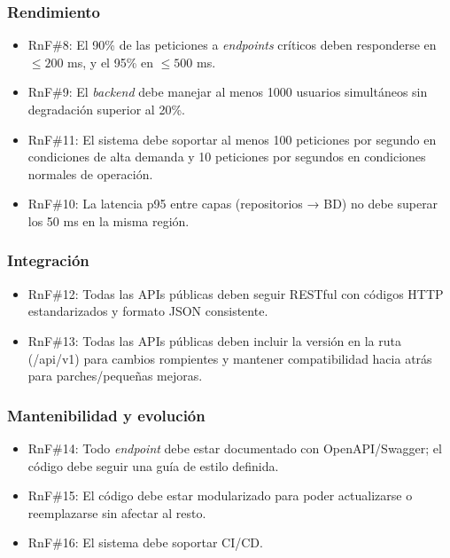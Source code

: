 \subsubsection{Rendimiento}

\begin{itemize}
	\item \ac{RnF}\#8: El 90\% de las peticiones a \textit{endpoints} críticos deben responderse en $ \leq 200 $ ms, y el 95\% en $ \leq 500 $ ms.
	\item \ac{RnF}\#9: El \textit{backend} debe manejar al menos 1000 usuarios simultáneos sin degradación superior al 20\%.
	\item \ac{RnF}\#11: El sistema debe soportar al menos 100 peticiones por segundo en condiciones de alta demanda y 10 peticiones por segundos en condiciones normales de operación.
	\item \ac{RnF}\#10: La latencia p95 entre capas (repositorios → \ac{BD}) no debe superar los 50 ms en la misma región.
\end{itemize}

\subsubsection{Integración}

\begin{itemize}
	\item \ac{RnF}\#12: Todas las \ac{API}s públicas deben seguir \ac{REST}ful con códigos \ac{HTTP} estandarizados y formato \ac{JSON} consistente.
	\item \ac{RnF}\#13: Todas las \ac{API}s públicas deben incluir la versión en la ruta (/api/v1) para cambios rompientes y mantener compatibilidad hacia atrás para parches/pequeñas mejoras.
\end{itemize}

\subsubsection{Mantenibilidad y evolución}

\begin{itemize}
	\item \ac{RnF}\#14: Todo \textit{endpoint} debe estar documentado con OpenAPI/Swagger; el código debe seguir una guía de estilo definida.
	\item \ac{RnF}\#15: El código debe estar modularizado para poder actualizarse o reemplazarse sin afectar al resto.
	\item \ac{RnF}\#16: El sistema debe soportar \ac{CI/CD}.
\end{itemize}

